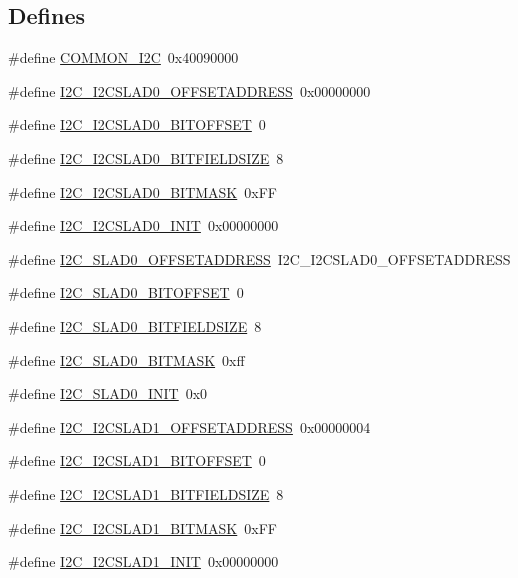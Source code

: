 \subsection*{Defines}
\begin{DoxyCompactItemize}
\item 
\#define \hyperlink{a00558_a6314807e922d0da7c37bc8441607a868}{COMMON\_\-I2C}~0x40090000
\item 
\#define \hyperlink{a00558_acb6be668f1ee4393562a6dc25e2e293e}{I2C\_\-I2CSLAD0\_\-OFFSETADDRESS}~0x00000000
\item 
\#define \hyperlink{a00558_ac112a9407cb305ad60d5abf648a3effe}{I2C\_\-I2CSLAD0\_\-BITOFFSET}~0
\item 
\#define \hyperlink{a00558_aa7c527f9286485d4a2162c2907c4386d}{I2C\_\-I2CSLAD0\_\-BITFIELDSIZE}~8
\item 
\#define \hyperlink{a00558_a3fdc43d203d00fa8135356b8c8799496}{I2C\_\-I2CSLAD0\_\-BITMASK}~0xFF
\item 
\#define \hyperlink{a00558_a610cadb277ae3856ef9e98bcaf0a828f}{I2C\_\-I2CSLAD0\_\-INIT}~0x00000000
\item 
\#define \hyperlink{a00558_a09a45b2e139e03c96e3e89c0362d4ca3}{I2C\_\-SLAD0\_\-OFFSETADDRESS}~I2C\_\-I2CSLAD0\_\-OFFSETADDRESS
\item 
\#define \hyperlink{a00558_a3fb2ad3a29bb48a9b94931ba57b246b1}{I2C\_\-SLAD0\_\-BITOFFSET}~0
\item 
\#define \hyperlink{a00558_a372ff75ba44c1a558e3cd8ce94592bdd}{I2C\_\-SLAD0\_\-BITFIELDSIZE}~8
\item 
\#define \hyperlink{a00558_af413bb1776ed7b569c86d0b775ff57ec}{I2C\_\-SLAD0\_\-BITMASK}~0xff
\item 
\#define \hyperlink{a00558_ab97cdd139517bdc8b6dac090c354ead5}{I2C\_\-SLAD0\_\-INIT}~0x0
\item 
\#define \hyperlink{a00558_a8f4ac9a844f60b127ba3feccd036f260}{I2C\_\-I2CSLAD1\_\-OFFSETADDRESS}~0x00000004
\item 
\#define \hyperlink{a00558_a1f1b7194fe852224475768162fda21f1}{I2C\_\-I2CSLAD1\_\-BITOFFSET}~0
\item 
\#define \hyperlink{a00558_ac8fba42c860195f031fa9e7fe9b1728c}{I2C\_\-I2CSLAD1\_\-BITFIELDSIZE}~8
\item 
\#define \hyperlink{a00558_a4723244e82ce8c8eeae3907dbee0b0c8}{I2C\_\-I2CSLAD1\_\-BITMASK}~0xFF
\item 
\#define \hyperlink{a00558_a7974bec8b07391581991a473a3151ddc}{I2C\_\-I2CSLAD1\_\-INIT}~0x00000000
\item 

\end{DoxyCompactItemize}
